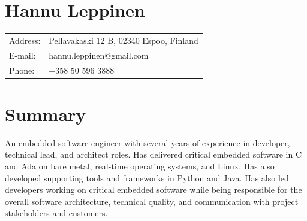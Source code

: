 \documentclass{article}
\begin{document}
\noindent%
\begin{minipage}{.70\textwidth}

\section*{Hannu Leppinen}

\begin{tabular}{ l l }
Address: & Pellavakaski 12 B, 02340 Espoo, Finland \\
E-mail:  & hannu.leppinen@gmail.com \\
Phone:	 & +358 50 596 3888
\end{tabular}

\section*{Summary}

An embedded software engineer with several years of experience in developer, technical lead, and architect roles.
Has delivered critical embedded software in C and Ada on bare metal, real-time operating systems, and Linux.
Has also developed supporting tools and frameworks in Python and Java.
Has also led developers working on critical embedded software while being responsible for the overall software architecture,
technical quality, and communication with project stakeholders and customers.

\end{minipage}%
\hfill
\end{document}
